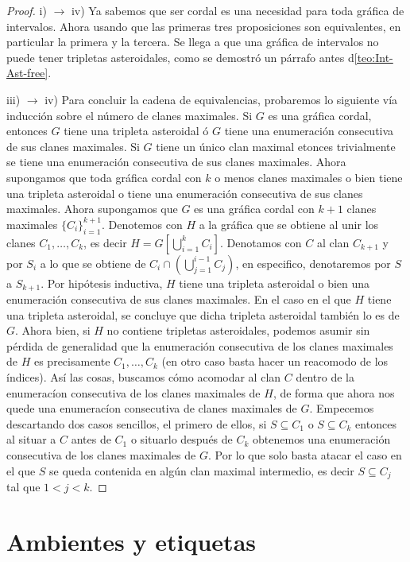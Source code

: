 \begin{proof}
    i) $\to $ iv) Ya sabemos que ser cordal es una necesidad para toda gráfica de intervalos. Ahora usando que las primeras tres proposiciones son equivalentes, en particular la primera y la tercera. Se llega a que una gráfica de intervalos no puede tener tripletas asteroidales, como se demostró un párrafo antes d\cref{teo:Int-Ast-free}.    

    iii) $\to$ iv) Para concluir la cadena de equivalencias, probaremos lo siguiente vía inducción sobre el número de clanes maximales. Si $G $ es una gráfica cordal, entonces $G$ tiene una tripleta asteroidal ó $G$ tiene una enumeración consecutiva de sus clanes maximales. Si $G$ tiene un único clan maximal etonces trivialmente se tiene una enumeración consecutiva de sus clanes maximales.  Ahora supongamos que toda gráfica cordal con $k$ o menos clanes maximales o bien tiene una tripleta asteroidal o tiene una enumeración consecutiva de sus clanes maximales. Ahora supongamos que $G$ es una gráfica cordal con $k+1$ clanes maximales $\{C_i\}_{i=1}^{k+1}$. Denotemos con $H$ a la gráfica que se obtiene al unir los clanes $C_1, \dots , C_k$, es decir $H=G[\bigcup_{i=1}^k C_i ]$. Denotamos con $C$ al clan $C_{k+1}$ y por $S_i$ a lo que se obtiene de $C_{i}\cap (\bigcup_{j=1}^{i-1} C_j)$, en especifico, denotaremos por $S$ a $S_{k+1}$. Por hipótesis inductiva, $H$ tiene una tripleta asteroidal o bien una enumeración consecutiva de sus clanes maximales. En el caso en el que $H$ tiene una tripleta asteroidal, se concluye que dicha tripleta asteroidal también lo es de $G$. Ahora bien, si $H$ no contiene tripletas asteroidales, podemos asumir sin pérdida de generalidad que la enumeración consecutiva de los clanes maximales de $H$ es precisamente $C_1,\dots, C_k$ (en otro caso basta hacer un reacomodo de los índices).
    Así las cosas, buscamos cómo acomodar al clan $C$ dentro de la enumeracíon consecutiva de los clanes maximales de $H$, de forma que ahora nos quede una enumeracíon consecutiva de clanes maximales de $G$. Empecemos descartando dos casos sencillos, el primero de ellos, si $S\subseteq C_1$ o $S\subseteq C_k$ entonces al situar a $C$ antes de $C_1$ o situarlo después de $C_k$ obtenemos una enumeración consecutiva de los clanes maximales de $G$. Por lo que solo basta atacar el caso en el que $S$ se queda contenida en algún clan maximal intermedio, es decir $S\subseteq C_j$ tal que $1<j<k$. 

    
    \end{proof}

 

\section{Ambientes y etiquetas}
\label{sec:etiquetas}

